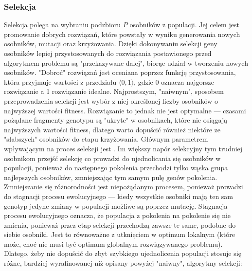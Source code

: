 \subsubsection{Selekcja}
Selekcja polega na wybraniu podzbioru $ P $ osobników z populacji. Jej celem jest promowanie dobrych rozwiązań, które powstały w wyniku generowania nowych osobników, mutacji oraz krzyżowania. Dzięki dokonywaniu selekcji geny osobników lepiej przystosowanych do rozwiązania postawionego przed algorytmem problemu są "przekazywane dalej", biorąc udział w tworzeniu nowych osobników. "Dobroć" rozwiązań jest oceniana poprzez funkcję przystosowania, która przyjmuje wartości z przedziału $ \langle 0, 1 \rangle $, gdzie 0 oznacza najgorsze rozwiązanie a 1 rozwiązanie idealne.
Najprostszym, "naiwnym", sposobem przeprowadzenia selekcji jest wybór z niej określonej liczby osobników o najwyższej wartości fitness. Rozwiązanie to jednak nie jest optymalne --- czasami pożądane fragmenty genotypu są "ukryte" w osobnikach, które nie osiągają najwyższych wartości fitness, dlatego warto dopuścić również niektóre ze "słabszych" osobników do etapu krzyżowania.
Głównym parametrem wpływającym na proces selekcji jest . Im większy napór selekcyjny tym trudniej osobnikom przejść selekcję co prowadzi do ujednolicania się osobników w populacji, ponieważ do następnego pokolenia przechodzi tylko wąska grupa najlepszych osobników, zmniejszając tym samym pulę genów pokolenia. Zmniejszanie się różnorodności jest niepożądanym procesem, ponieważ prowadzi do stagnacji procesu ewolucyjnego --- kiedy wszystkie osobniki mają ten sam genotyp jedyne zmiany w populacji możliwe są poprzez mutację. Stagnacja procesu ewolucyjnego oznacza, że populacja z pokolenia na pokolenie się nie zmienia, ponieważ przez etap selekcji przechodzą zawsze te same, podobne do siebie osobniki. Jest to równoważne z utknięciem w optimum lokalnym (które może, choć nie musi być optimum globalnym rozwiązywanego problemu). Dlatego, żeby nie dopuścić do zbyt szybkiego ujednolicenia populacji stosuje się różne, bardziej wyrafinowanej niż opisany powyżej "naiwny", algorytmy selekcji:


